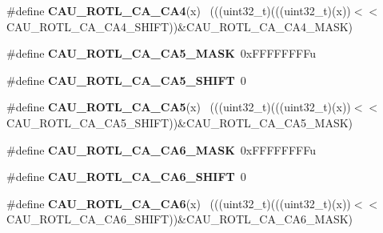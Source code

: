 \begin{DoxyCompactItemize}
\item 
\hypertarget{group___c_a_u___register___masks_gafb9930d5a46d118395d854985e3f43de}{}\#define {\bfseries C\+A\+U\+\_\+\+R\+O\+T\+L\+\_\+\+C\+A\+\_\+\+C\+A4}(x)                                          ~(((uint32\+\_\+t)(((uint32\+\_\+t)(x))$<$$<$C\+A\+U\+\_\+\+R\+O\+T\+L\+\_\+\+C\+A\+\_\+\+C\+A4\+\_\+\+S\+H\+I\+F\+T))\&C\+A\+U\+\_\+\+R\+O\+T\+L\+\_\+\+C\+A\+\_\+\+C\+A4\+\_\+\+M\+A\+S\+K)\label{group___c_a_u___register___masks_gafb9930d5a46d118395d854985e3f43de}

\item 
\hypertarget{group___c_a_u___register___masks_gabe2d7ee2c1b7e53de4b94cd8b07970c7}{}\#define {\bfseries C\+A\+U\+\_\+\+R\+O\+T\+L\+\_\+\+C\+A\+\_\+\+C\+A5\+\_\+\+M\+A\+S\+K}~0x\+F\+F\+F\+F\+F\+F\+F\+Fu\label{group___c_a_u___register___masks_gabe2d7ee2c1b7e53de4b94cd8b07970c7}

\item 
\hypertarget{group___c_a_u___register___masks_gafa3e712c8b162bbf2553bc695bdcab76}{}\#define {\bfseries C\+A\+U\+\_\+\+R\+O\+T\+L\+\_\+\+C\+A\+\_\+\+C\+A5\+\_\+\+S\+H\+I\+F\+T}~0\label{group___c_a_u___register___masks_gafa3e712c8b162bbf2553bc695bdcab76}

\item 
\hypertarget{group___c_a_u___register___masks_gabd45f6210c1fdd2119d4cca61137f5eb}{}\#define {\bfseries C\+A\+U\+\_\+\+R\+O\+T\+L\+\_\+\+C\+A\+\_\+\+C\+A5}(x)                                          ~(((uint32\+\_\+t)(((uint32\+\_\+t)(x))$<$$<$C\+A\+U\+\_\+\+R\+O\+T\+L\+\_\+\+C\+A\+\_\+\+C\+A5\+\_\+\+S\+H\+I\+F\+T))\&C\+A\+U\+\_\+\+R\+O\+T\+L\+\_\+\+C\+A\+\_\+\+C\+A5\+\_\+\+M\+A\+S\+K)\label{group___c_a_u___register___masks_gabd45f6210c1fdd2119d4cca61137f5eb}

\item 
\hypertarget{group___c_a_u___register___masks_ga65aeaeccabea3838690c668b87c2c773}{}\#define {\bfseries C\+A\+U\+\_\+\+R\+O\+T\+L\+\_\+\+C\+A\+\_\+\+C\+A6\+\_\+\+M\+A\+S\+K}~0x\+F\+F\+F\+F\+F\+F\+F\+Fu\label{group___c_a_u___register___masks_ga65aeaeccabea3838690c668b87c2c773}

\item 
\hypertarget{group___c_a_u___register___masks_ga1185b9302856e4d9138c798916b4cb6f}{}\#define {\bfseries C\+A\+U\+\_\+\+R\+O\+T\+L\+\_\+\+C\+A\+\_\+\+C\+A6\+\_\+\+S\+H\+I\+F\+T}~0\label{group___c_a_u___register___masks_ga1185b9302856e4d9138c798916b4cb6f}

\item 
\hypertarget{group___c_a_u___register___masks_gad3f1dee0f6d8d354632e49325ce00558}{}\#define {\bfseries C\+A\+U\+\_\+\+R\+O\+T\+L\+\_\+\+C\+A\+\_\+\+C\+A6}(x)                                          ~(((uint32\+\_\+t)(((uint32\+\_\+t)(x))$<$$<$C\+A\+U\+\_\+\+R\+O\+T\+L\+\_\+\+C\+A\+\_\+\+C\+A6\+\_\+\+S\+H\+I\+F\+T))\&C\+A\+U\+\_\+\+R\+O\+T\+L\+\_\+\+C\+A\+\_\+\+C\+A6\+\_\+\+M\+A\+S\+K)\label{group___c_a_u___register___masks_gad3f1dee0f6d8d354632e49325ce00558}


\end{DoxyCompactItemize}
